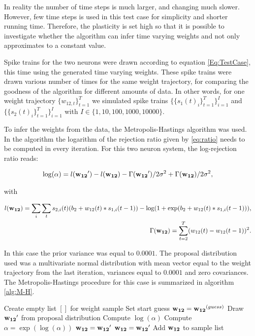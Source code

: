 In reality the number of time steps is much larger, and changing much slower. However, few time steps is used in this test case for simplicity and shorter running time. Therefore, the plasticity is set high so that it is possible to investigate whether the algorithm can infer time varying weights and not only approximates to a constant value. 

Spike trains for the two neurons were drawn according to equation \ref{Eq:TestCase}, this time using the generated time varying weights. These spike trains were drawn various number of times for the same weight trajectory, for comparing the goodness of the algorithm for different amounts of data. In other words, for one weight trajectory $\{w_{12,t}\}_{t=1}^T$ we simulated spike trains
$\{\{s_{1}(t)_i\}_{t=1}^T\}_{i=1}^I$ and $\{\{s_{2}(t)_i\}_{t=1}^T\}_{i=1}^I$ with $I \in \{1,10,100,1000,10000 \}$.

To infer the weights from the data, the Metropolis-Hastings algorithm was used. In the algorithm the logarithm of the rejection ratio given by \ref{eq:ratio} needs to be computed in every iteration. For this two neuron system, the log-rejection ratio reads:

\begin{equation}
    \log ( \alpha) = l({\bf w_{12}}') - l({\bf w_{12}}) - \Gamma({\bf w_{12}}')/2\sigma^2 + \Gamma({\bf w_{12}})/2\sigma^2,
\end{equation} 

with

\begin{equation}
\begin{split}
    l({\bf w_{12}}) = \sum_i \sum_t s_{2,i}(t)(b_2 + w_{12}(t)*s_{1,i}(t-1)) - \log(1 + \exp(b_2 + w_{12}(t) * s_{1,i}(t-1))), \\
    \Gamma({\bf w_{12}}) = \sum_{t=2}^T (w_{12}(t) - w_ {12}(t-1))^2.
\end{split}
\end{equation}

In this case the prior variance was equal to $ 0.0001$. The proposal distribution used was a multivariate normal distribution with mean vector equal to the weight trajectory from the last iteration, variances equal to $0.0001$ and zero covariances. 
The Metropolis-Hastings procedure for this case is summarized in algorithm \ref{alg:M-H}.

\begin{algorithm}
\caption{}\label{alg:M-H}
\begin{algorithmic}
\State Create empty list $[]$ for weight sample
\State Set start guess ${\bf w_{12}} = {\bf w_{12}}^{(guess)}$
\State Draw ${\bf w_{12}}'$ from proposal distribution
\State Compute $\log(\alpha)$
\State Compute $\alpha = \exp(\log(\alpha))$
\State ${\bf w_{12}} = {\bf w_{12}}'$
\Else 
{}
\State ${\bf w_{12}} = {\bf w_{12}}'$
\EndIf
\EndIf
\State Add ${\bf w_{12}}$ to sample list
\EndFor
\end{algorithmic}
\end{algorithm}

